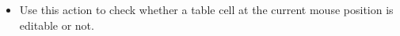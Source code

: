 
\begin{itemize}
\item Use this action to check whether a table cell at the current mouse position is editable or not.
\end{itemize}

